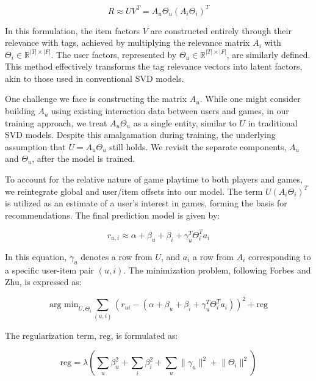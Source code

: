 \documentclass[sigplan,screen]{acmart}
\begin{document}
\begin{equation}
  R \approx U V^T = A_u \Theta_u (A_i \Theta_i)^T
\end{equation}

In this formulation, the item factors \(V\) are constructed entirely through their relevance with tags, achieved by multiplying the relevance matrix \(A_i\) with \(\Theta_i \in \mathbb{R}^{|T| \times |F|}\). The user factors, represented by \(\Theta_u \in \mathbb{R}^{|T| \times |F|}\), are similarly defined. This method effectively transforms the tag relevance vectors into latent factors, akin to those used in conventional SVD models.

One challenge we face is constructing the matrix \(A_u\). While one might consider building \(A_u\) using existing interaction data between users and games, in our training approach, we treat \(A_u\Theta_u\) as a single entity, similar to \(U\) in traditional SVD models. Despite this amalgamation during training, the underlying assumption that \(U = A_u\Theta_u\) still holds. We revisit the separate components, \(A_u\) and \(\Theta_u\), after the model is trained.

To account for the relative nature of game playtime to both players and games, we reintegrate global and user/item offsets into our model. The term \(U(A_i \Theta_i)^T\) is utilized as an estimate of a user's interest in games, forming the basis for recommendations. The final prediction model is given by:

\begin{equation}
  r_{u,i} \approx \alpha + \beta_u + \beta_i + \gamma_u^T\Theta_i^Ta_i
\end{equation}

In this equation, \(\gamma_u\) denotes a row from \(U\), and \(a_i\) a row from \(A_i\) corresponding to a specific user-item pair \((u,i)\). The minimization problem, following Forbes and Zhu\cite{ForbesZhu11}, is expressed as:

\begin{equation}
 \text{arg min}_{U, \Theta_i} \sum_{(u,i)} (r_{ui} - (\alpha + \beta_u + \beta_i + \gamma_u^T\Theta_i^Ta_i))^2 + \text{reg}
\end{equation}

The regularization term, \(\text{reg}\), is formulated as:

\begin{equation}
 \text{reg} = \lambda \left(\sum_u \beta_u^2 + \sum_i \beta_i^2 + \sum_u \lVert \gamma_u \rVert^2 + \lVert \Theta_i \rVert^2\right)
\end{equation}
\end{document}
